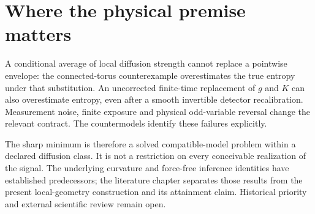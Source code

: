 \section{Where the physical premise matters}
A conditional average of local diffusion strength cannot replace a pointwise
envelope: the connected-torus counterexample overestimates the true entropy
under that substitution. An uncorrected finite-time replacement of $g$ and
$K$ can also overestimate entropy, even after a smooth invertible detector
recalibration. Measurement noise, finite exposure and physical odd-variable
reversal change the relevant contract. The countermodels identify these
failures explicitly.

The sharp minimum is therefore a solved compatible-model problem within a
declared diffusion class. It is not a restriction on every conceivable
realization of the signal. The underlying curvature and force-free inference
identities have established predecessors; the literature chapter separates
those results from the present local-geometry construction and its attainment
claim. Historical priority and external scientific review remain open.
